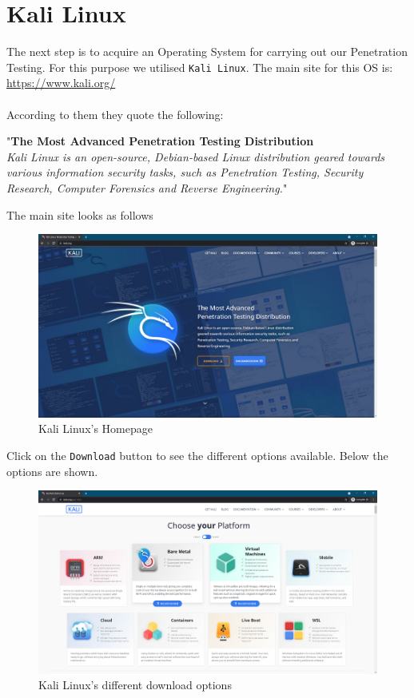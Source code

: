 \documentclass[a4paper, 12pt, titlepage]{report}
\begin{document}
\section{Kali Linux}
The next step is to acquire an Operating System for carrying out our Penetration Testing. For this purpose we utilised \texttt{Kali Linux}. The main site for this OS is: \url{https://www.kali.org/}\\\\
According to them they quote the following:
\begin{displayquote}
"\textbf{The Most Advanced Penetration Testing Distribution}\\
\textit{Kali Linux is an open-source, Debian-based Linux distribution geared towards various information security tasks, such as Penetration Testing, Security Research, Computer Forensics and Reverse Engineering.}"
\end{displayquote}
\pagebreak
The main site looks as follows
\begin{figure}[H]
    \centering
    \includegraphics[scale=0.5]{pics/kali.PNG}
    \caption{Kali Linux's Homepage}
\end{figure}
Click on the \texttt{Download} button to see the different options available. Below the options are shown.
\begin{figure}[H]
    \centering
    \includegraphics[scale=0.5]{pics/kalidown.PNG}
    \caption{Kali Linux's different download options}
\end{figure}
\end{document}
